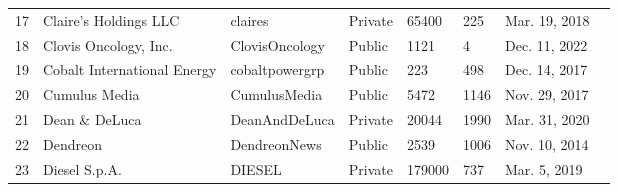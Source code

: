 \documentclass[9pt,twoside,lineno]{pnas-new}
\begin{document}
\begin{longtable}{llllllll}
17          & Claire's Holdings LLC                                                           & claires                                                             & Private          & 65400              & 225                & Mar. 19, 2018                                                                                                                        \\
18          & Clovis Oncology, Inc.                                                           & ClovisOncology                                                      & Public           & 1121               & 4                  & Dec. 11, 2022                                                                                                                     \\
19          & Cobalt International Energy                                                     & cobaltpowergrp                                                      & Public           & 223                & 498                & Dec. 14, 2017                                                                                                                     \\
20          & Cumulus Media                                                                   & CumulusMedia                                                        & Public           & 5472               & 1146               & Nov. 29, 2017                                                                                                                     \\
21          & Dean \& DeLuca                                                                  & DeanAndDeLuca                                                       & Private          & 20044              & 1990               & Mar. 31, 2020                                                                                                                        \\
22          & Dendreon                                                                        & DendreonNews                                                        & Public           & 2539               & 1006               & Nov. 10, 2014                                                                                                                     \\
23          & Diesel S.p.A.                                                                   & DIESEL                                                              & Private          & 179000             & 737                & Mar. 5, 2019                                                                                                                         \\

\end{longtable}
\end{document}
